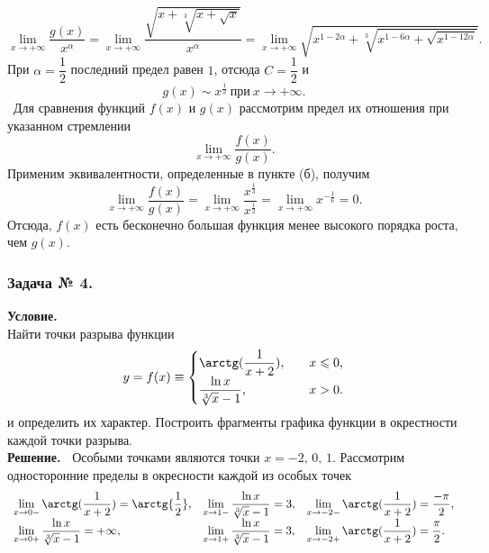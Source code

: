 $$
\lim\limits_{x\rightarrow+\infty}\dfrac{g(x)}{x^{\alpha}} = 
\lim\limits_{x\rightarrow+\infty}\dfrac{\sqrt{x+\sqrt[3]{x+\sqrt{x}}}}{x^{\alpha}} =
\lim\limits_{x\rightarrow+\infty}\sqrt{x^{1-2\alpha}+\sqrt[3]{x^{1-6\alpha}+\sqrt{x^{1-12\alpha}}}}.
$$
При $\alpha=\dfrac{1}{2}$ последний предел равен $1$, отсюда $C=\dfrac{1}{2}$ и
$$
g(x)\sim x^{\frac{1}{2}}~\text{при}~x\rightarrow+\infty.
$$
~Для сравнения функций $f(x)$ и $g(x)$ рассмотрим предел их отношения при указанном стремлении
$$
\lim\limits_{x\rightarrow+\infty}\dfrac{f(x)}{g(x)}.
$$
Применим эквивалентности, определенные в пункте (б), получим
$$
\lim\limits_{x\rightarrow+\infty}\dfrac{f(x)}{g(x)} = 
\lim\limits_{x\rightarrow+\infty}\dfrac{x^\frac{1}{3}}{x^{\frac{1}{2}}} = 
\lim\limits_{x\rightarrow+\infty} x^{-\frac{1}{6}} = 0.  
$$
Отсюда, $f(x)$ есть бесконечно большая функция менее высокого порядка роста, чем $g(x)$.

\subsubsection*{\center Задача № 4.}
{\bf Условие.~}\\
Найти точки разрыва функции 
$$
y = f(x) \equiv 
\begin{cases}
\arctg(\dfrac{1}{x+2}),				&\quad x\leqslant0, \\
\dfrac{\ln{x}}{\sqrt[3]{x}-1},&\quad x>0.
\end{cases}
$$ 
и определить их характер. Построить фрагменты графика функции в окрестности каждой точки разрыва. \\
{\bf Решение.~}	
Особыми точками являются точки $x=-2,\,0,\,1$. Рассмотрим односторонние пределы в окресности каждой из особых точек
$$
\begin{array}{lll}
\lim\limits_{x\rightarrow 0-} \arctg(\dfrac{1}{x+2}) = \arctg{\dfrac{1}{2}}, &
\lim\limits_{x\rightarrow 1-} \dfrac{\ln{x}}{\sqrt[3]{x}-1} = 3, &
\lim\limits_{x\rightarrow -2-} \arctg(\dfrac{1}{x+2}) = \dfrac{-\pi}{2}, \\  
\lim\limits_{x\rightarrow 0+} \dfrac{\ln{x}}{\sqrt[3]{x}-1} = +\infty, &
\lim\limits_{x\rightarrow 1+} \dfrac{\ln{x}}{\sqrt[3]{x}-1} = 3, & 
  \lim\limits_{x\rightarrow -2+} \arctg(\dfrac{1}{x+2}) = \dfrac{\pi}{2}.
\end{array}
$$


